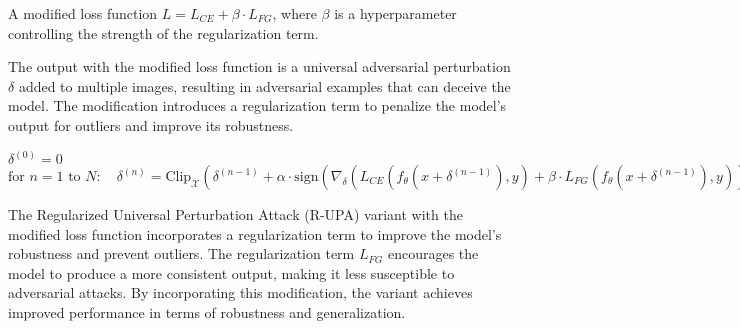 A modified loss function $L = L_{CE} + \beta \cdot L_{FG}$, where $\beta$ is a hyperparameter controlling the strength of the regularization term.

The output with the modified loss function is a universal adversarial perturbation $\delta$ added to multiple images, resulting in adversarial examples that can deceive the model. The modification introduces a regularization term to penalize the model's output for outliers and improve its robustness.

$\delta^{(0)} = 0$
$\text{for } n = 1 \text{ to } N: \quad
\delta^{(n)} = \text{Clip}_{\mathcal{X}} \left( \delta^{(n-1)} + \alpha \cdot \text{sign} \left( \nabla_\delta (L_{CE}(f_\theta(x + \delta^{(n-1)}), y) + \beta \cdot L_{FG}(f_\theta(x + \delta^{(n-1)}), y)) \right) \right)$

The Regularized Universal Perturbation Attack (R-UPA) variant with the modified loss function incorporates a regularization term to improve the model's robustness and prevent outliers. The regularization term $L_{FG}$ encourages the model to produce a more consistent output, making it less susceptible to adversarial attacks. By incorporating this modification, the variant achieves improved performance in terms of robustness and generalization.